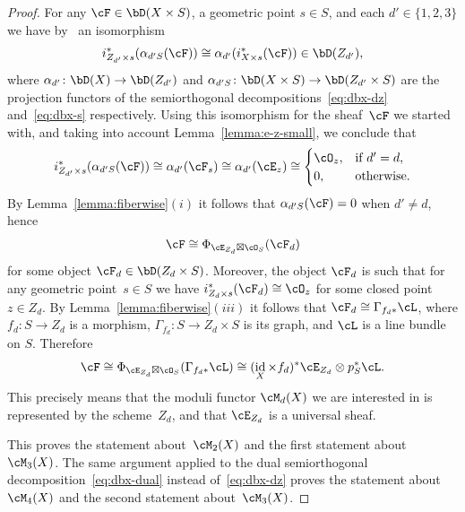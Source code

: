 \documentclass[11pt]{amsart}
\DeclareMathOperator{\id}{\mathrm{id}}
\theoremstyle{plain}
\theoremstyle{definition}
\theoremstyle{remark}
\begin{document}
\begin{proof}
For any $\cF \in \bD(X \times S)$, a geometric point $s \in S$, and each $d' \in \{1,2,3\}$ we have by~\cite[(11)]{kuznetsov2011base} an isomorphism
\begin{equation*}
i_{Z_{d'} \times s}^*(\alpha_{d'S}(\cF)) \cong \alpha_{d'}(i_{X \times s}^*(\cF)) \in \bD(Z_{d'}),
\end{equation*}
where $\alpha_{d'} \colon \bD(X) \to \bD(Z_{d'})$ and $\alpha_{d'S} \colon \bD(X \times S) \to \bD(Z_{d'} \times S)$ are 
the projection functors of the semiorthogonal decompositions~\eqref{eq:dbx-dz} and~\eqref{eq:dbx-s} respectively.
Using this isomorphism for the sheaf~$\cF$ we started with, and taking into account Lemma~\ref{lemma:e-z-small}, we conclude that
\begin{equation*}
i_{Z_{d'} \times s}^*(\alpha_{d'S}(\cF)) \cong \alpha_{d'}(\cF_s) \cong \alpha_{d'}(\cE_z) \cong 
\begin{cases}
\cO_z, & \text{if $d' = d$},\\
0, & \text{otherwise}.
\end{cases}
\end{equation*} 
By Lemma~\ref{lemma:fiberwise}$(i)$ it follows that $\alpha_{d'S}(\cF) = 0$ when $d' \ne d$, hence 
\begin{equation*}
\cF \cong \Phi_{\cE_{Z_d} \boxtimes \cO_S}(\cF_d)
\end{equation*}
for some object $\cF_d \in \bD(Z_d \times S)$.
Moreover, the object $\cF_d$ is such that for any geometric point~$s \in S$ we have  $i_{Z_d \times s}^*(\cF_d) \cong \cO_z$ for some closed point~$z \in Z_d$.
By Lemma~\ref{lemma:fiberwise}$(iii)$ it follows that $\cF_d \cong \Gamma_{f_d*}\cL$, where $f_d \colon S \to Z_d$ is a morphism, $\Gamma_{f_d} \colon S \to Z_d \times S$ is its graph, and $\cL$ is a line bundle on $S$.
Therefore
\begin{equation*}
\cF \cong \Phi_{\cE_{Z_d} \boxtimes \cO_S}(\Gamma_{f_d*}\cL) 
\cong (\id_X \times f_d)^*\cE_{Z_d} \otimes p_S^*\cL.
\end{equation*}
This precisely means that the moduli functor $\cM_d(X)$ we are interested in is represented by the scheme~$Z_d$, 
and that $\cE_{Z_d}$ is a universal sheaf.

This proves the statement about~$\cM_2(X)$ and the first statement about~$\cM_3(X)$.
The same argument applied to the dual semiorthogonal decomposition~\eqref{eq:dbx-dual} instead of~\eqref{eq:dbx-dz} 
proves the statement about~$\cM_4(X)$ and the second statement about~$\cM_3(X)$.
\end{proof}
\end{document}

